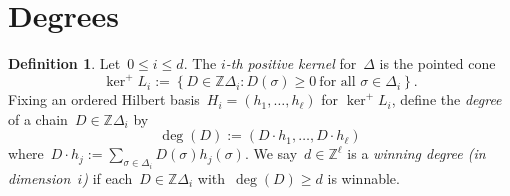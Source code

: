 \documentclass[12pt]{article}
\newcommand{\Z}{\mathbb{Z}}
\theoremstyle{definition}
\newtheorem{definition}[theorem]{Definition}
\theoremstyle{remark}
\begin{document}
\section{Degrees}
\begin{definition} Let~$0\leq i\leq d$.  The {\em $i$-th positive kernel}
  for~$\Delta$ is the pointed cone
  \[
    \ker^{+}L_i:=\left\{ D\in \Z \Delta_i: D(\sigma)\geq0\ \text{for all $\sigma\in \Delta_i$}
    \right\}.
  \]
  Fixing an ordered Hilbert basis~$H_i=(h_1,\dots,h_{\ell})$ for
  $\ker^{+}L_i$, define the {\em degree}
  of a chain~$D\in\Z \Delta_i$ by
  \[
    \deg(D):= (D\cdot h_1,\dots, D\cdot h_{\ell})
  \]
  where~$D\cdot h_j:=\sum_{\sigma\in \Delta_i}D(\sigma)h_j(\sigma)$.  
  We say~$d\in\Z^{\ell}$ is a {\em winning degree (in dimension~$i$)} if
  each~$D\in \Z \Delta_i$
  with~$\deg(D)\geq d$ is winnable.
\end{definition}
\end{document}
